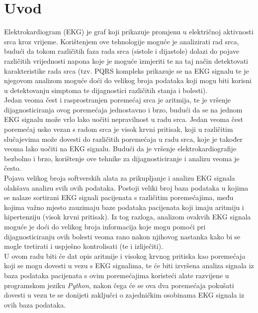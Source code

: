 \documentclass[12pt,a4paper]{article}
\begin{document}


\tableofcontents

\newpage


\section{Uvod}

\quad Elektrokardiogram (EKG) je graf koji prikazuje promjenu u električnoj aktivnosti srca kroz vrijeme. Korištenjem ove tehnologije moguće je analizirati rad srca, budući da tokom različitih faza rada srca (sistole i dijastole) dolazi do pojave različitih vrijednosti napona koje je moguće izmjeriti te na taj način detektovati karakteristike rada srca (tzv. PQRS kompleks prikazuje se na EKG signalu te je njegovom analizom moguće doći do velikog broja podataka koji mogu biti korisni u detektovanju simptoma te dijagnostici različitih stanja i bolesti). \\

Jedan veoma čest i rasprostranjen poremećaj srca je aritmija, te je vršenje dijagnosticiranja ovog poremećaja jednostavno i brzo, budući da se na jednom EKG signalu može vrlo lako uočiti nepravilnost u radu srca. Jedan veoma čest poremećaj usko vezan s radom srca je visok krvni pritisak, koji u različitim slučajevima može dovesti do različitih poremećaja u radu srca, koje je također veoma lako uočiti na EKG signalu. Budući da je vršenje elektrokardiografije bezbolno i brzo, korištenje ove tehnike za dijagnosticiranje i analizu veoma je često. \\

Pojava velikog broja softverskih alata za prikupljanje i analizu EKG signala olakšava analizu svih ovih podataka. Postoji veliki broj baza podataka u kojima se nalaze sortirani EKG signali pacijenata s različitim poremećajima, među kojima važno mjesto zauzimaju baze podataka pacijenata koji imaju aritmiju i hipertenziju (visok krvni pritisak). Iz tog razloga, analizom ovakvih EKG signala moguće je doći do velikog broja informacija koje mogu pomoći pri dijagnosticiranju ovih bolesti veoma rano nakon njihovog nastanka kako bi se mogle tretirati i uspješno kontrolisati (te i izliječiti). \\

U ovom radu biti će dat opis aritmije i visokog krvnog pritiska kao poremećaja koji se mogu dovesti u vezu s EKG signalima, te će biti izvršena analiza signala iz baza podataka pacijenata s ovim poremećajima koristeći alate razvijene u programskom jeziku \textit{Python}, nakon čega će se ova dva poremećaja pokušati dovesti u vezu te se donijeti zaključci o zajedničkim osobinama EKG signala iz ovih baza podataka.
\end{document}
